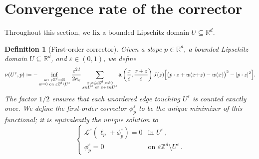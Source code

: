 \documentclass[11pt]{amsart}
\theoremstyle{plain}
\newtheorem{definition}[theorem]{Definition}
\theoremstyle{definition}
\theoremstyle{remark}
\newcommand{\Zd}{\mathbb{Z}^d}
\newcommand{\Rd}{\mathbb{R}^d}
\newcommand{\R}{\mathbb{R}}
\renewcommand{\a}{\mathbf{a}}
\newcommand{\eps}{\varepsilon}
\begin{document}
	\section{Convergence rate of the corrector}
	\label{sec:mainresult}
	
	Throughout this section, we fix a bounded Lipschitz domain $U \subseteq \Rd$.
	
	\begin{definition}[First-order corrector]
		Given a slope $p \in \Rd$, a bounded Lipschitz domain $U \subseteq \Rd$, and $\eps \in (0, 1)$, we define
		\begin{equation}
			\label{e.nu}
			\nu(U^\eps, p)
			\coloneqq -\inf_{\substack{w \colon \eps\Zd \to \R \\ w = 0 \text{ on } \eps\Zd \setminus U^\eps}}
			\frac{\eps^{2d}}{2\kappa_\eps}
			\sum_{\substack{x, z \in \eps\Zd, z \ne 0 \\ x \in U^\eps \text{ or } x+z \in U^\eps}}
			\a\left(\frac{x}{\eps}, \frac{x+z}{\eps}\right) J(z)
			\Bigl[\bigl(p \cdot z + w(x{+}z) - w(x)\bigr)^2 - |p \cdot z|^2\Bigr].
		\end{equation}
		The factor $1/2$ ensures that each unordered edge touching $U^\eps$ is counted exactly once.
		We define the first-order corrector $\phi_p^\eps$ to be the unique minimizer of this functional; it is equivalently the unique solution to
		\begin{equation} \label{eq:elleqdefnu}
			\begin{cases}
				\mathcal{L}^\eps(\ell_p + \phi_p^\eps) = 0 & \text{in } U^\eps\,,\\
				\phi_p^\eps = 0 & \text{on } \eps\Zd \setminus U^\eps\,.
			\end{cases}
		\end{equation}
	\end{definition}
	
\end{document}
